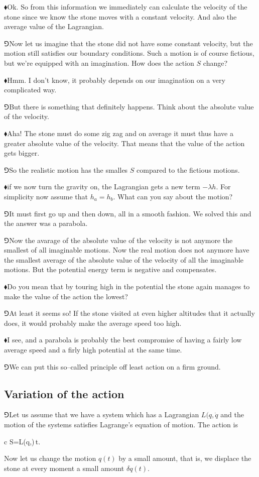 \documentclass[10pt,oneside%
]{memoir}
\newenvironment{eqna}{\begin{IEEEeqnarray*}{c}}{\end{IEEEeqnarray*}\ignorespacesafterend}
\newcommand{\dd}{\mathrm{d}}
\newcommand{\hea}{\(\blacklozenge\)\;}
\newcommand{\heb}{\(\Game\)\;}
\begin{document}
\hea Ok. So from this information we immediately can calculate the velocity of the stone since we know the stone moves with a constant velocity. And also the average value of the Lagrangian.

\heb Now let us imagine that the stone did not have some constant velocity, but the motion still satisfies our boundary conditions. Such a motion is of course fictious, but we're equipped with an imagination. How does the action \(S\) change?

\hea Hmm. I don't know, it probably depends on our imagination on a very complicated way.

\heb But there is something that definitely happens. Think about the absolute value of the velocity.

\hea Aha! The stone must do some zig zag and on average it must thus have a greater absolute value of the velocity. That means that the value of the action gets bigger.

\heb So the realistic motion has the smalles \(S\) compared to the fictious motions.

\hea if we now turn the gravity on, the Lagrangian gets a new term \(-\lambda h\). For simplicity now assume that \(h_a=h_b\). What can you say about the motion?

\heb It must first go up and then down, all in a smooth fashion. We solved this and the answer was a parabola.

\heb Now the avarage of the absolute value of the velocity is not anymore the smallest of all imaginable motions. Now the real motion does not anymore have the smallest average of the absolute value of the velocity of all the imaginable motions. But the potential energy term is negative and compensates.

\hea Do you mean that by touring high in the potential the stone again manages to make the value of the action the lowest?

\heb At least it seems so! If the stone visited at even higher altitudes that it actually does, it would probably make the average speed too high.

\hea I see, and a parabola is probably the best compromise of having a fairly low average speed and a firly high potential at the same time.

\heb We can put this so--called principle off least action on a firm ground.
\subsection{Variation of the action}
\heb Let us assume that we have a system which has a Lagrangian \(L(q,\dot{q}\) and the motion of the systems satisfies Lagrange's equation of motion. The action is
\begin{eqna}
    S=\int L(q,)\,\dd t.
\end{eqna}
Now let us change the motion \(q(t)\) by a small amount, that is, we displace the stone at every moment a small amount \(\delta q(t)\).
\end{document}
